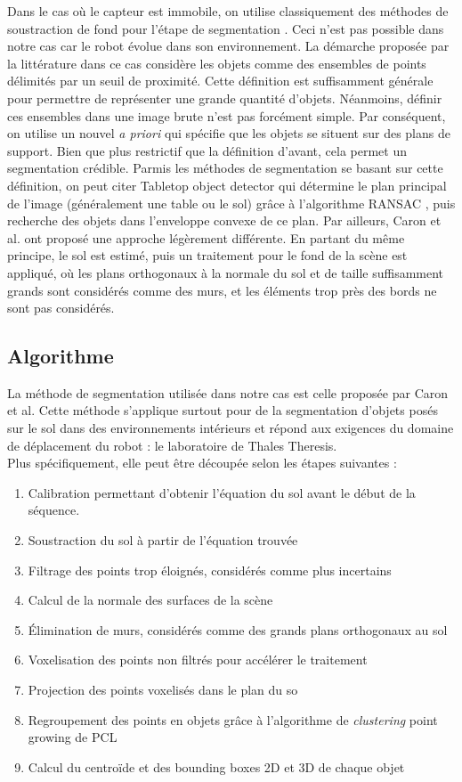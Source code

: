 Dans le cas où le capteur est immobile, on utilise classiquement des méthodes de soustraction de fond pour l'étape de segmentation \cite{dai2006prospects}. Ceci n'est pas possible dans notre cas car le robot évolue dans son environnement. La démarche proposée par la littérature dans ce cas considère les objets comme des ensembles de points délimités par un seuil de proximité. Cette définition est suffisamment générale pour permettre de représenter une grande quantité d'objets. Néanmoins, définir ces ensembles dans une image brute n'est pas forcément simple. Par conséquent, on utilise un nouvel \textit{a priori} qui spécifie que les objets se situent sur des plans de support. Bien que plus restrictif que la définition d'avant, cela permet un segmentation crédible. Parmis les méthodes de segmentation se basant sur cette définition, on peut citer Tabletop object detector \cite{tabletop} qui détermine le plan principal de l'image (généralement une table ou le sol) grâce à l'algorithme RANSAC \cite{fischler1981random}, puis recherche des objets dans l'enveloppe convexe de ce plan. Par ailleurs, Caron et al. \cite{caron2014neural} ont proposé une approche légèrement différente. En partant du même principe, le sol est estimé, puis un traitement pour le fond de la scène est appliqué, où les plans orthogonaux à la normale du sol et de taille suffisamment grands sont considérés comme des murs, et les éléments trop près des bords ne sont pas considérés. 

\subsection{Algorithme}

La méthode de segmentation utilisée dans notre cas est celle proposée par Caron et al. Cette méthode s'applique surtout pour de la segmentation d'objets posés sur le sol dans des environnements intérieurs et répond aux exigences du domaine de déplacement du robot : le laboratoire de Thales Theresis.\\

Plus spécifiquement, elle peut être découpée selon les étapes suivantes :
\begin{enumerate}[start=0]
\item Calibration permettant d'obtenir l'équation du sol avant le début de la séquence.
\item Soustraction du sol à partir de l'équation trouvée
\item Filtrage des points trop éloignés, considérés comme plus incertains
\item Calcul de la normale des surfaces de la scène
\item Élimination de murs, considérés comme des grands plans orthogonaux au sol
\item Voxelisation des points non filtrés pour accélérer le traitement
\item Projection des points voxelisés dans le plan du so
\item Regroupement des points en objets grâce à l'algorithme de \textit{clustering} point growing de PCL
\item Calcul du centroïde et des bounding boxes 2D et 3D de chaque objet
\end{enumerate}

